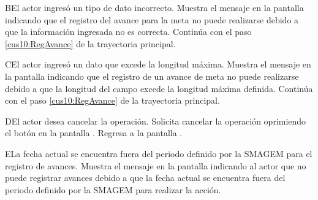     \begin{UCtrayectoriaA}{B}{El actor ingresó un tipo de dato incorrecto.}    
    \UCpaso[\UCsist] Muestra el mensaje  en la pantalla  indicando que el registro del avance para la meta no puede realizarse debido a que la información ingresada no es correcta.
    \UCpaso[] Continúa con el paso \ref{cus10:RegAvance} de la trayectoria principal.     
    \end{UCtrayectoriaA}
    
    \begin{UCtrayectoriaA}{C}{El actor ingresó un dato que excede la longitud máxima.}    
    \UCpaso[\UCsist] Muestra el mensaje  en la pantalla  indicando que el registro de un avance de meta no puede realizarse debido a que la longitud del campo excede la longitud máxima definida.
    \UCpaso[] Continúa con el paso \ref{cus10:RegAvance} de la trayectoria principal.     
    \end{UCtrayectoriaA}
 
     \begin{UCtrayectoriaA}{D}{El actor desea cancelar la operación.}
      \UCpaso[\UCactor] Solicita cancelar la operación oprimiendo el botón  en la pantalla .
      \UCpaso[\UCsist] Regresa a la pantalla . 
    \end{UCtrayectoriaA}

    \begin{UCtrayectoriaA}{E}{La fecha actual se encuentra fuera del periodo definido por la SMAGEM para el registro de avances.}
    \UCpaso[\UCsist] Muestra el mensaje  en la pantalla  indicando al actor que no puede registrar avances debido a que la fecha actual se encuentra fuera del periodo definido por la SMAGEM para realizar la acción. 
    \end{UCtrayectoriaA}